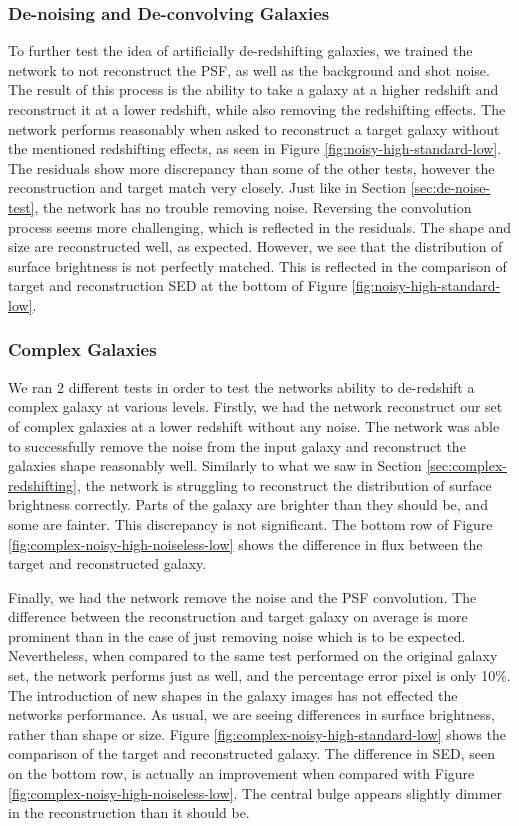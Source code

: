 \documentclass[fleqn,usenatbib]{mnras}
\begin{document}
\subsubsection{De-noising and De-convolving Galaxies} \label{sec:de-noise-convolve}
To further test the idea of artificially de-redshifting galaxies, we trained the network to not reconstruct the PSF, as well as the background and shot noise. The result of this process is the ability to take a galaxy at a higher redshift and reconstruct it at a lower redshift, while also removing the redshifting effects. The network performs reasonably when asked to reconstruct a target galaxy without the mentioned redshifting effects, as seen in Figure \ref{fig:noisy-high-standard-low}. The residuals show more discrepancy than some of the other tests, however the reconstruction and target match very closely. Just like in Section \ref{sec:de-noise-test}, the network has no trouble removing noise. Reversing the convolution process seems more challenging, which is reflected in the residuals. The shape and size are reconstructed well, as expected. However, we see that the distribution of surface brightness is not perfectly matched. This is reflected in the comparison of target and reconstruction SED at the bottom of Figure \ref{fig:noisy-high-standard-low}.

\subsubsection{Complex Galaxies} \label{sec:complex-de-redshifting}
We ran 2 different tests in order to test the networks ability to de-redshift a complex galaxy at various levels. Firstly, we had the network reconstruct our set of complex galaxies at a lower redshift without any noise. The network was able to successfully remove the noise from the input galaxy and reconstruct the galaxies shape reasonably well. Similarly to what we saw in Section \ref{sec:complex-redshifting}, the network is struggling to reconstruct the distribution of surface brightness correctly. Parts of the galaxy are brighter than they should be, and some are fainter. This discrepancy is not significant. The bottom row of Figure \ref{fig:complex-noisy-high-noiseless-low} shows the difference in flux between the target and reconstructed galaxy. 

Finally, we had the network remove the noise and the PSF convolution. The difference between the reconstruction and target galaxy on average is more prominent than in the case of just removing noise which is to be expected. Nevertheless, when compared to the same test performed on the original galaxy set, the network performs just as well, and the percentage error pixel is only 10\%. The introduction of new shapes in the galaxy images has not effected the networks performance. As usual, we are seeing differences in surface brightness, rather than shape or size. Figure \ref{fig:complex-noisy-high-standard-low} shows the comparison of the target and reconstructed galaxy. The difference in SED, seen on the bottom row, is actually an improvement when compared with Figure \ref{fig:complex-noisy-high-noiseless-low}. The central bulge appears slightly dimmer in the reconstruction than it should be.
\end{document}
